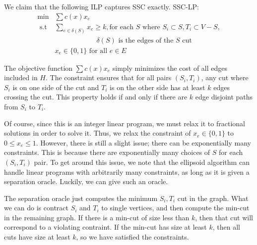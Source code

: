 \documentclass[12pt]{article}
\begin{document}
We claim that the following ILP captures SSC exactly. 
SSC-LP:
\begin{align}
\min & \sum c(x) x_e  \\
\text{ s.t } & \sum_{e \in \delta(S)} x_e \geq k, \text{for each }S\text{ where } S_i \subset S,T_i \subset V - S, \\ & \hspace{1in}\delta(S) \text{ is the edges of the $S$ cut } \\
& x_e \in \{0,1\} \text{ for all }e \in E
\end{align}

The objective function $\sum c(x) x_e$ simply minimizes the cost of all edges included in $H$. The constraint ensures that for all pairs $(S_i,T_i)$, any cut where $S_i$ is on one side of the cut and $T_i$ is on the other side has at least $k$ edges crossing the cut. This property holds if and only if there are $k$ edge disjoint paths from $S_i$ to $T_i$. 
%
%
% 

Of course, since this is an integer linear program, we must relax it to fractional solutions in order to solve it. Thus, we relax the constraint of $x_e \in \{0,1\}$ to $0 \leq x_e \leq 1$. However, there is still a slight issue; there can be exponentially many constraints. This is because there are exponentially many choices of $S$ for each $(S_i,T_i)$ pair. To get around this issue, we note that the ellipsoid algorithm can handle linear programs with arbitrarily many constraints, as long as it is given a separation oracle. Luckily, we can give such an oracle. 

The separation oracle just computes the minimum $S_i, T_i$ cut in the graph. What we can do is contract $S_i$ and $T_i$ to single vertices, and then compute the min-cut in the remaining graph. If there is a min-cut of size less than $k$, then that cut will correspond to a violating contraint. If the min-cut has size at least $k$, then all cuts have size at least $k$, so we have satisfied the constraints.
\end{document}
